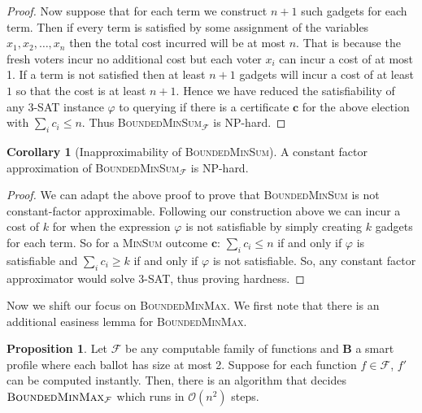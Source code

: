 \documentclass[11pt,a4paper, titlepage]{article}
\theoremstyle{definition}
\newtheorem{corollary}[theorem]{Corollary}
\newtheorem{proposition}[theorem]{Proposition}
\let\vec\mathbf
\newcommand{\BMM}{\textsc{BoundedMinMax}}
\begin{document}
\begin{proof}
    Now suppose that for each term we construct $n + 1$ such gadgets for each term. Then if every term is satisfied by some assignment of the variables $x_1, x_2, \ldots, x_n$ then the total cost incurred will be at most $n$. That is because the fresh voters incur no additional cost but each voter $x_i$ can incur a cost of at most 1.
    If a term is not satisfied then at least $n+1$ gadgets will incur a cost of at least $1$ so that the cost is at least $n+1$. 
    Hence we have reduced the satisfiability of any \textsc{3-SAT} instance $\varphi$ to querying if there is a certificate $\vec{c}$ for the above election with $\sum_{i} c_i \leq n$. Thus \textsc{BoundedMinSum}$_\mathcal{F}$ is NP-hard.
\end{proof}

\begin{corollary}[Inapproximability of \textsc{BoundedMinSum}] A constant factor approximation of \textsc{BoundedMinSum}$_\mathcal{F}$ is NP-hard.    
\end{corollary}

\begin{proof}
    We can adapt the above proof to prove that \textsc{BoundedMinSum} is not constant-factor approximable. 
    Following our construction above we can incur a cost of $k$ for when the expression $\varphi$ is not satisfiable by simply creating $k$ gadgets for each term. 
    So for a \textsc{MinSum} outcome $\vec{c}$:   $\sum_i c_i \leq n$ if and only if $\varphi$ is satisfiable and $\sum_i c_i \geq k$ if and only if $\varphi$ is not satisfiable. 
    So, any constant factor approximator would solve \textsc{3-SAT}, thus proving hardness.
\end{proof}

Now we shift our focus on \textsc{BoundedMinMax}.
We first note that there is an additional easiness lemma for \BMM.

\begin{proposition}
    Let $\mathcal{F}$ be any computable family of functions and $\vec{B}$ a smart profile where each ballot has size at most 2.
    Suppose for each function $f \in \mathcal{F}$, $f'$ can be computed instantly.
    Then, there is an algorithm that decides $\BMM_\mathcal{F}$ which runs in $\mathcal{O}(n^2)$ steps. 
\end{proposition}
\end{document}
